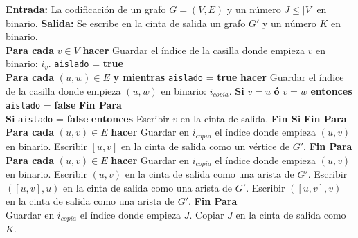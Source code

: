 \documentclass[12pt]{article}
\begin{document}
    \begin{algorithm}
        \caption{}\label{alg2}
        \begin{algorithmic}
            \STATE \textbf{Entrada:} La codificación de un grafo $G=(V,E)$ y un número $J\leq |V|$ en binario.
            \STATE \textbf{Salida:} Se escribe en la cinta de salida un grafo $G'$ y un número $K$ en binario.\\

            \noindent
            \STATE \textbf{Para cada} $v\in V$ \textbf{hacer}
            \STATE \quad Guardar el índice de la casilla donde empieza $v$ en binario: $i_v$.
            \STATE \quad \texttt{aislado} = \textbf{true}\\

            \noindent
            \STATE \quad \textbf{Para cada} $(u,w)\in E$ \textbf{y mientras} \texttt{aislado} = \textbf{true} \textbf{hacer}
            \STATE \quad \quad Guardar el índice de la casilla donde empieza $(u, w)$ en binario: $i_{copia}$.
            \STATE \quad \quad \textbf{Si} $v = u$ \textbf{ó} $v = w$ \textbf{entonces} \texttt{aislado} = \textbf{false}
            \STATE \quad \textbf{Fin Para}\\

            \noindent
            \STATE \quad \textbf{Si} \texttt{aislado} = \textbf{false} \textbf{entonces}
            \STATE \quad \quad Escribir $v$ en la cinta de salida.
            \STATE \quad \textbf{Fin Si}
            \STATE \textbf{Fin Para}\\

            \noindent
            \STATE \textbf{Para cada} $(u,v)\in E$ \textbf{hacer}
            \STATE \quad Guardar en $i_{copia}$ el índice donde empieza $(u,v)$ en binario.
            \STATE \quad Escribir $[u, v]$ en la cinta de salida como un vértice de $G'$.
            \STATE \textbf{Fin Para}\\

            \noindent
            \STATE \textbf{Para cada} $(u,v)\in E$ \textbf{hacer}
            \STATE \quad Guardar en $i_{copia}$ el índice donde empieza $(u,v)$ en binario.
            \STATE \quad Escribir $(u, v)$ en la cinta de salida como una arista de $G'$.
            \STATE \quad Escribir $([u, v], u)$ en la cinta de salida como una arista de $G'$.
            \STATE \quad Escribir $([u, v], v)$ en la cinta de salida como una arista de $G'$.
            \STATE \textbf{Fin Para}\\

            \noindent
            \STATE Guardar en $i_{copia}$ el índice donde empieza $J$.
            \STATE Copiar $J$ en la cinta de salida como $K$.
        \end{algorithmic}
    \end{algorithm}
\end{document}
